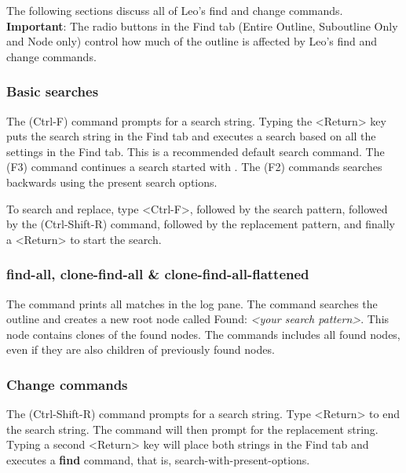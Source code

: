\documentclass[a4paper,10pt,english]{sphinxmanual}
\begin{document}
The following sections discuss all of Leo's find and change commands.
\textbf{Important}: The radio buttons in the Find tab (Entire Outline,
Suboutline Only and Node only) control how much of the outline is
affected by Leo's find and change commands.


\subsubsection{Basic searches}
\label{commands:basic-searches}
The  (Ctrl-F) command prompts for a
search string. Typing the \textless{}Return\textgreater{} key puts the search string in the
Find tab and executes a search based on all the settings in the Find
tab. This is a recommended default search command. The 
(F3) command continues a search started with
. The  (F2) commands
searches backwards using the present search options.

To search and replace, type \textless{}Ctrl-F\textgreater{}, followed by the search pattern,
followed by the  (Ctrl-Shift-R) command, followed by
the replacement pattern, and finally a \textless{}Return\textgreater{} to start the search.


\subsubsection{find-all, clone-find-all \& clone-find-all-flattened}
\label{commands:find-all-clone-find-all-clone-find-all-flattened}
The  command prints all matches in the log pane. The
 command searches the outline and creates a new root node
called Found: \emph{\textless{}your search pattern\textgreater{}}. This node contains clones of the
found nodes. The  commands includes all found
nodes, even if they are also children of previously found nodes.


\subsubsection{Change commands}
\label{commands:change-commands}
The  (Ctrl-Shift-R) command prompts for a search string.
Type \textless{}Return\textgreater{} to end the search string. The command will then prompt for
the replacement string. Typing a second \textless{}Return\textgreater{} key will place both
strings in the Find tab and executes a \textbf{find} command, that is,
search-with-present-options.
\end{document}
